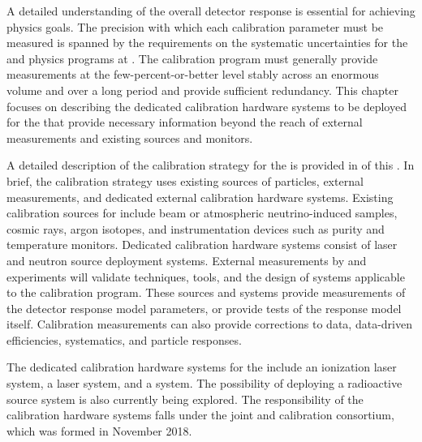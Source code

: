 


A detailed understanding of the overall detector response is essential for achieving  physics goals. The precision with which each calibration parameter must be measured is spanned by the requirements on the %
systematic uncertainties for the  %
and  physics programs at . The calibration program must generally provide measurements at the few-percent-or-better 
level stably across an enormous volume and over a long period and provide sufficient redundancy. This chapter focuses on describing the dedicated calibration hardware systems to be deployed for the   that provide necessary information beyond the reach of external measurements and existing sources and monitors. 

A detailed description of the calibration strategy for the   is provided in \physchtools of this . In brief, %
the %
calibration strategy %
uses existing sources of particles, external measurements, and dedicated external calibration hardware systems. Existing calibration sources for  include beam or atmospheric neutrino-induced samples, cosmic rays, argon isotopes, and instrumentation devices such as  purity and temperature monitors. Dedicated calibration hardware systems consist of laser  and neutron source deployment systems.  External measurements by  and  experiments  will validate techniques, tools, and the design of systems applicable to the  calibration program. These sources and systems provide measurements of the detector response model parameters, or provide tests of the response model itself. Calibration measurements can also provide corrections to data, data-driven efficiencies, systematics, and particle responses.


The dedicated calibration hardware systems for the  include an ionization laser system, a \phel laser system, and a  system. The possibility of deploying a radioactive source system is also currently being explored. The responsibility of the calibration hardware systems falls under the joint  and  calibration consortium, which was formed in November 2018.



